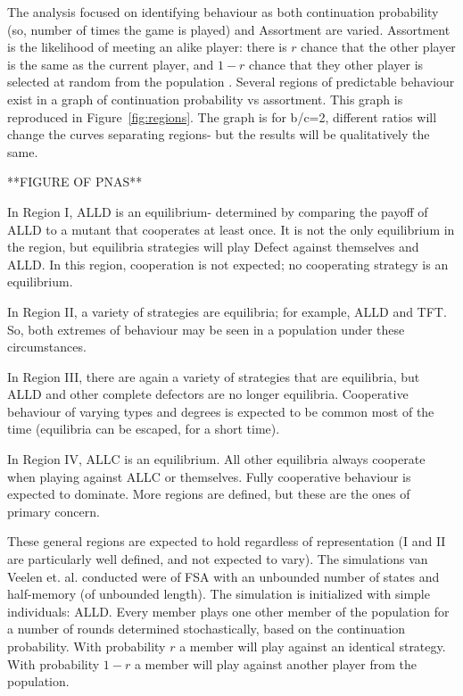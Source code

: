 \documentclass[a4paper,11pt,bcshonoursthesis,singlespace,twoside,thesisdraft,pdflatex]{cssethesis}
\begin{document}
The analysis focused on identifying behaviour as both continuation probability (so, number of times the game is played) and Assortment are varied. Assortment is the likelihood of meeting an alike player: there is $r$ chance that the other player is the same as the current player, and $1-r$ chance that they other player is selected at random from the population \citep{eshel:PNAS:1982}. Several regions of predictable behaviour exist in a graph of continuation probability vs assortment. This graph is reproduced in Figure~\ref{fig:regions}. The graph is for b/c=2, different ratios will change the curves separating regions- but the results will be qualitatively the same. 

**FIGURE OF PNAS**

In Region I, ALLD is an equilibrium- determined by comparing the payoff of ALLD to a mutant that cooperates at least once. It is not the only equilibrium in the region, but equilibria strategies will play Defect against themselves and ALLD. In this region, cooperation is not expected; no cooperating strategy is an equilibrium.

In Region II, a variety of strategies are equilibria; for example, ALLD and TFT. So, both extremes of behaviour may be seen in a population under these circumstances. 

In Region III, there are again a variety of strategies that are equilibria, but ALLD and other complete defectors are no longer equilibria. Cooperative behaviour of varying types and degrees is expected to be common most of the time (equilibria can be escaped, for a short time).

In Region IV, ALLC is an equilibrium. All other equilibria always cooperate when playing against ALLC or themselves. Fully cooperative behaviour is expected to dominate. More regions are defined, but these are the ones of primary concern.

These general regions are expected to hold regardless of representation (I and II are particularly well defined, and not expected to vary).
The simulations van Veelen et. al. conducted were of FSA with an unbounded number of states and half-memory (of unbounded length). The simulation is initialized with simple individuals: ALLD. Every member plays one other member of the population for a number of rounds determined stochastically, based on the continuation probability. With probability $r$ a member will play against an identical strategy. With probability $1-r$ a member will play against another player from the population. 
\end{document}
